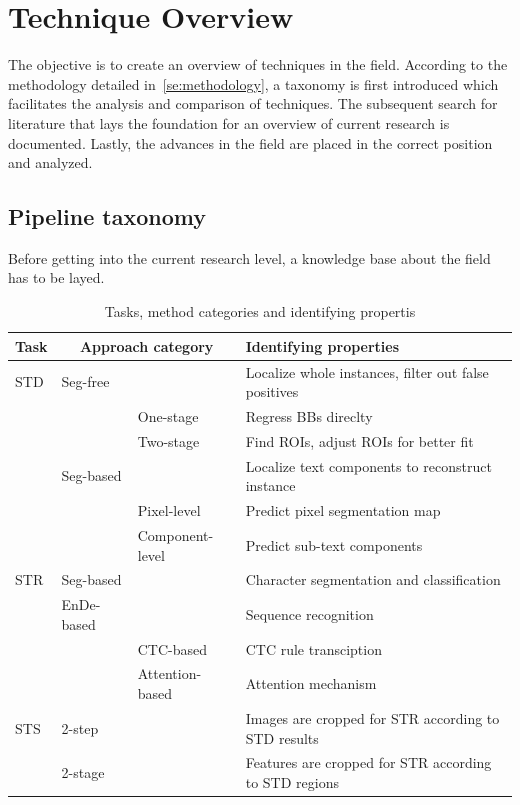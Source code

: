 \chapter{Technique Overview}\label{ch:research}
The objective is to create an overview of techniques in the field.
According to the methodology detailed in~\ref{se:methodology}, a taxonomy is first introduced
which facilitates the analysis and comparison of techniques.
The subsequent search for literature that lays the foundation for an overview of current research
is documented.
Lastly, the advances in the field are placed in the correct position and analyzed.

\section{Pipeline taxonomy}\label{se:taxonomy}
Before getting into the current research level, a knowledge base about the field has to be layed.
\begin{table}[h]
    \centering\scriptsize
    \begin{tabular}{p{}p{}p{}p{}}
        Task & \multicolumn{2}{c}{Approach category} & Identifying properties \\
        \toprule
        STD & Seg-free & & Localize whole instances, filter out false positives \\
            & & One-stage & Regress BBs direclty \\
            & & Two-stage & Find ROIs, adjust ROIs for better fit \\
            & Seg-based & & Localize text components to reconstruct instance \\
            & & Pixel-level & Predict pixel segmentation map\\
            & & Component-level & Predict sub-text components \\
        \midrule
        STR & Seg-based & & Character segmentation and classification\\
            & \ac{EnDe}-based & & Sequence recognition \\
            & & CTC-based & CTC rule transciption \\
            & & Attention-based & Attention mechanism \\
        \midrule
        STS & 2-step & & Images are cropped for STR according to STD results \\
            & 2-stage & & Features are cropped for STR according to STD regions \\
        \bottomrule
    \end{tabular}
    \caption{Tasks, method categories and identifying propertis\label{tb:steps-properties}}
\end{table}
